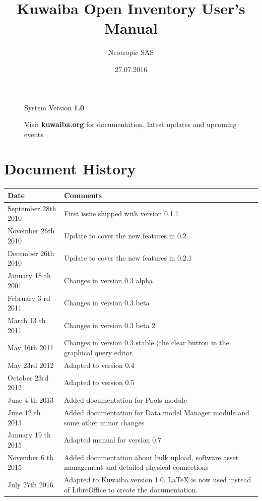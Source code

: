 \documentclass[a4paper]{article}
\title{Kuwaiba Open Inventory User's Manual}
\author{Neotropic SAS}
\date{27.07.2016}
\begin{document}
	\maketitle
	
	
	
	\begin{figure}[b]
		\centering System Version \textbf{1.0}
			
		Visit \textbf{kuwaiba.org} for documentation, latest updates and upcoming events
	\end{figure}
	
	
	\newpage
	
	\tableofcontents

	\newpage
	\section{Document History}
		\begin{table}[h!]
			\centering
			\begin{tabular}{l||p{10cm}} %
				\toprule
				\textbf{Date} & \textbf{Comments}  \\
				\midrule
				September 28th 2010 & First issue shipped with version 0.1.1\\
				\midrule
				November 26th 2010 & Update to cover the new features in 0.2 \\
				\midrule
				December 26th 2010 & Update to cover the new features in 0.2.1 \\
				\midrule
				January 18 th 2001 & Changes in version 0.3 alpha \\
				\midrule
				February 3 rd 2011 & Changes in version 0.3 beta \\
				\midrule
				March 13 th	2011 & Changes in version 0.3 beta 2 \\
				\midrule
				May 16th 2011 & Changes in version 0.3 stable (the clear button in the graphical query editor \\
				\midrule
				May 23rd 2012 & Adapted to version 0.4 \\
				\midrule
				October 23rd 2012 & Adapted to version 0.5 \\
				\midrule
				June 4 th 2013 & Added documentation	for Pools module \\
				\midrule
				June 12 th 2013 & Added documentation for Data model Manager module and some other minor changes\\
				\midrule
				January 19 th 2015 & Adapted manual for version 0.7 \\
				\midrule
				November 6 th 2015 & Added documentation about bulk upload, software asset management and detailed physical connections \\
				\midrule
				July 27th 2016 & Adapted to Kuwaiba version 1.0. LaTeX is now used instead of LibreOffice to create the documentation. \\
				\bottomrule
			\end{tabular}	
				
		\end{table}
	\newpage
\end{document}
